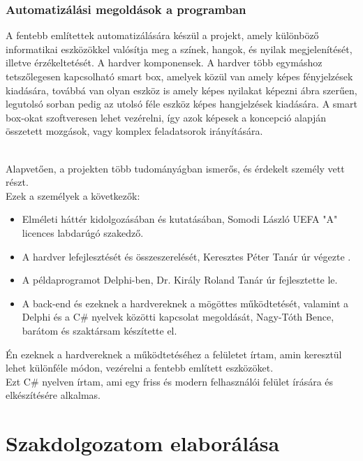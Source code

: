 \documentclass[tocnopagenum]{thesis-ekf}
\theoremstyle{definition}
\theoremstyle{remark}
\begin{document}
	\subsection{Automatizálási megoldások a programban}
	A fentebb említettek automatizálására készül a projekt, amely különböző informatikai eszközökkel valósítja meg a színek, hangok, és nyilak megjelenítését, illetve érzékeltetését. 
	A hardver komponensek. A hardver több egymáshoz tetszőlegesen kapcsolható smart box, amelyek közül van amely képes fényjelzések kiadására, továbbá van olyan eszköz is amely képes nyilakat képezni ábra szerűen, legutolsó sorban pedig az utolsó féle eszköz képes hangjelzések kiadására. A smart box-okat szoftveresen lehet vezérelni, így azok képesek a koncepció alapján összetett mozgások, vagy komplex feladatsorok irányítására.

	\\
	Alapvetően, a projekten több tudományágban ismerős, és érdekelt személy vett részt. 
	\\
	Ezek a személyek a következők:
	\begin{itemize}
		\item Elméleti háttér kidolgozásában és kutatásában, Somodi László UEFA "A" licences labdarúgó szakedző.
	
		\item A hardver lefejlesztését és összeszerelését, Keresztes Péter Tanár úr végezte . 
		\item A példaprogramot Delphi-ben, Dr. Király Roland Tanár úr fejlesztette le. 
		\item A back-end és ezeknek a hardvereknek a mögöttes működtetését, valamint a Delphi és a C\# nyelvek közötti kapcsolat megoldását, Nagy-Tóth Bence, barátom és szaktársam készítette el.
	\end{itemize}
	Én ezeknek a hardvereknek a működtetéséhez a felületet írtam, amin keresztül lehet különféle módon, vezérelni a fentebb említett eszközöket. %
	\\ 
	Ezt C\# nyelven írtam, ami egy friss és modern felhasználói felület írására és elkészítésére alkalmas.
	
	\chapter{Szakdolgozatom elaborálása}
\end{document}
